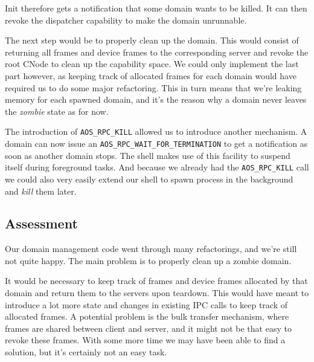 \documentclass[a4paper,10pt]{article}
\begin{document}
Init therefore gets a notification that some domain wants to be killed.
It can then revoke the dispatcher capability to make the domain unrunnable.

The next step would be to properly clean up the domain.
This would consist of returning all frames and device frames to the corresponding server and revoke the root CNode to clean up the capability space.
We could only implement the last part however, as keeping track of allocated frames for each domain would have required us to do some major refactoring.
This in turn means that we're leaking memory for each spawned domain, and it's the reason why a domain never leaves the \emph{zombie} state as for now.

The introduction of \lstinline!AOS_RPC_KILL! allowed us to introduce another mechanism.
A domain can now issue an \lstinline!AOS_RPC_WAIT_FOR_TERMINATION! to get a notification as soon as another domain stops.
The shell makes use of this facility to suspend itself during foreground tasks.
And because we already had the \lstinline!AOS_RPC_KILL! call we could also very easily extend our shell to spawn process in the background and \emph{kill} them later.

\subsection{Assessment}
Our domain management code went through many refactorings, and we're still not quite happy.
The main problem is to properly clean up a zombie domain.

It would be necessary to keep track of frames and device frames allocated by that domain and return them to the servers upon teardown.
This would have meant to introduce a lot more state and changes in existing IPC calls to keep track of allocated frames.
A potential problem is the bulk transfer mechanism, where frames are shared between client and server, and it might not be that easy to revoke these frames.
With some more time we may have been able to find a solution, but it's certainly not an easy task.

\end{document}
